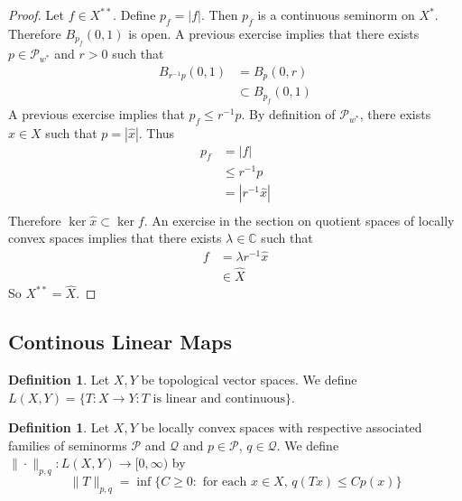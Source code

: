 \documentclass[12pt]{amsart}
\theoremstyle{definition}
\newtheorem{defn}[definition]{Definition}
\newcommand{\lam}{\lambda}
\newcommand{\C}{\mathbb{C}}
\newcommand{\MP}{\mathcal{P}}
\newcommand{\MQ}{\mathcal{Q}}
\DeclareMathOperator*{\0}{\mbf{0}}
\DeclareMathOperator*{\1}{\mbf{1}}
\begin{document}
	\begin{proof}
		Let $f \in X^{**}$. Define $p_{f} = |f|$. Then $p_f$ is a continuous seminorm on $X^*$. Therefore $B_{p_f}(0,1)$ is open. A previous exercise implies that there exists $p \in \MP_{w^*}$ and $r >0$ such that 
		\begin{align*}
			B_{r^{-1}p}(0,1)
			& = B_{p}(0,r) \\
			& \subset B_{p_f}(0,1)
		\end{align*}
		A previous exercise implies that $p_f \leq r^{-1}p$. By definition of $\MP_{w^*}$, there exists $x \in X$ such that $p = |\hat{x}|$. Thus
		\begin{align*}
			p_f
			& = |f| \\
			& \leq r^{-1}p \\
			& = |r^{-1}\hat{x}| \\
		\end{align*} 
	Therefore $\ker \hat{x} \subset \ker f$. An exercise in the section on quotient spaces of locally convex spaces implies that there exists $\lam \in \C$ such that 
	\begin{align*}
		f 
		& = \lam r^{-1}\hat{x} \\
		& \in \hat{X}
	\end{align*}
	So $X^{**} = \hat{X}$.
	\end{proof}




























\newpage
\subsection{Continous Linear Maps}

\begin{defn}
	Let $X,Y$ be topological vector spaces. We define $L(X,Y) = \{T:X \rightarrow Y: T \text{ is linear and continuous}\}$.
\end{defn}

\begin{defn}
	Let $X, Y$ be locally convex spaces with respective associated families of seminorms $\MP$ and $\MQ$ and $p \in \MP$, $q \in \MQ$. We define $\|\cdot\|_{p,q}: L(X, Y) \rightarrow [0, \infty)$ by 
	$$\|T\|_{p,q} = \inf \{C \geq 0: \text{ for each $x \in X$, $q(Tx) \leq Cp(x)$} \}$$
\end{defn}
\end{document}
